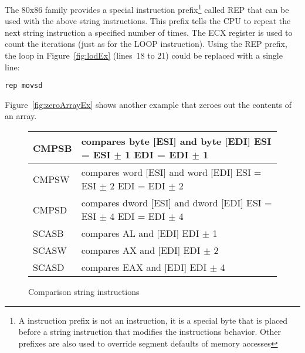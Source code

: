The 80x86 family provides a special instruction prefix\footnote{A
instruction prefix is not an instruction, it is a special byte that is
placed before a string instruction that modifies the instructions
behavior. Other prefixes are also used to override segment defaults of
memory accesses} called {\code REP} that can be used with the above string
instructions. This prefix tells the CPU to repeat the next string instruction
a specified number of times. The ECX register is used to count the iterations
(just as for the {\code LOOP} instruction). Using the {\code REP} prefix, 
the loop in Figure~\ref{fig:lodEx} (lines~18 to 21) could be replaced with
a single line:
\begin{lstlisting}[language={[x86masm]Assembler},frame=none, numbers=none]
      rep movsd
\end{lstlisting}
Figure~\ref{fig:zeroArrayEx} shows another example that zeroes out the
contents of an array.

\begin{figure}[t]
\centering
{\code
\begin{tabular}{|lp{3.5in}|}
\hline
CMPSB & compares byte [ESI] and byte [EDI] \newline ESI = ESI $\pm$ 1 
        \newline EDI = EDI $\pm$ 1 \\
\hline
CMPSW & compares word [ESI] and word [EDI] \newline ESI = ESI $\pm$ 2 
        \newline EDI = EDI $\pm$ 2 \\
\hline
CMPSD & compares dword [ESI] and dword [EDI] \newline ESI = ESI $\pm$ 4 
        \newline EDI = EDI $\pm$ 4 \\
\hline
SCASB & compares AL and [EDI] \newline EDI $\pm$ 1 \\
\hline
SCASW & compares AX and [EDI] \newline EDI $\pm$ 2 \\
\hline
SCASD & compares EAX and [EDI] \newline EDI $\pm$ 4 \\
\hline
\end{tabular}
}
\caption{Comparison string instructions\label{fig:cmpString}
            
          }
\end{figure}

